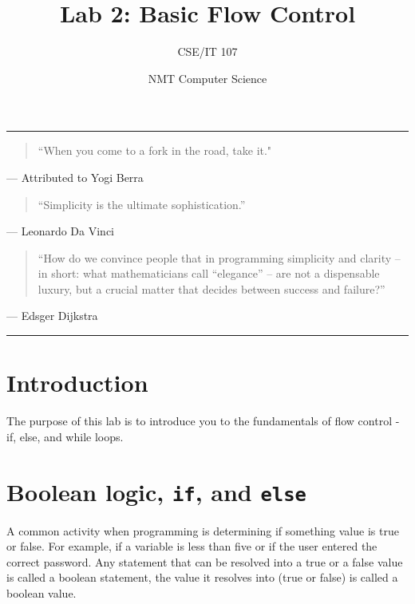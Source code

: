 \documentclass[12pt,hidelinks]{article}
\title{Lab 2: Basic Flow Control}
\author{CSE/IT 107}
\date{NMT Computer Science}
\begin{document}
\maketitle

\hrule

\begin{quotation}
``When you come to a fork in the road, take it."
\end{quotation}
\begin{flushright}
--- Attributed to Yogi Berra
\end{flushright}

\begin{quotation}
``Simplicity is the ultimate sophistication.''
\end{quotation}
\begin{flushright}
--- Leonardo Da Vinci
\end{flushright}

\begin{quotation}
``How do we convince people that in programming simplicity and clarity -- in
short: what mathematicians call ``elegance'' -- are not a dispensable luxury, but
a crucial matter that decides between success and failure?''
\end{quotation}
\begin{flushright}
--- Edsger Dijkstra
\end{flushright}

\hrule

\section{Introduction}
The purpose of this lab is to introduce you to the fundamentals of flow control - if, else, and while loops.

\section{Boolean logic, \texttt{if}, and \texttt{else}}
A common activity when programming is determining if something value is true or false. For example, if a variable is less than five or if the user entered the correct password. Any statement that can be resolved into a true or a false value is called a boolean statement, the value it resolves into (true or false) is called a boolean value.
\end{document}
